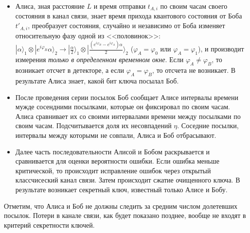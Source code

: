 \begin{itemize}
  \item Алиса, зная расстояние $L$ и время отправки $t_{A,i}$ по своим часам своего состояния в канал связи, знает время прихода квантового состояния от Боба $t'_{A,i}$, преобразует состояния, случайно и независимо от Боба изменяет относительную фазу одной из <<половинок>>: 
  $|\alpha\rangle_1 \otimes |e^{i\varphi_B}\alpha\rangle_2 \rightarrow |\frac{\alpha}{2}\rangle_1 \otimes |\frac{(e^{i\varphi_B} - e^{i\varphi_A})\alpha}{2}\rangle_2$
  ($\varphi_A = \varphi_0$ или $\varphi_A = \varphi_1$), и производит измерения \textit{только в определенном временном окне}. 
  Если $\varphi_A \neq \varphi_B$, то возникает отсчет в детекторе, а если $\varphi_A = \varphi_B$, то отсчета не возникает. В результате Алиса знает, какой бит ключа посылал Боб.
  
  \item После проведения серии посылок Боб сообщает Алисе интервалы времени мужде сосендними посылками, которые он фиксировал по своим часам. Алиса сравнивает их со своими интервалами времени между посылками по своим часам. Подсчитывается доля их несовпадений $\eta$. Соседние посылки, интервалы между которыми не совпали, Алиса и Боб отбрасывают.
  
  \item Далее часть последовательности Алисой и Бобом раскрывается и сравнивается для оценки вероятности ошибки. Если ошибка меньше критической, то происходит исправление ошибок через открытый классчисеский канал связи. Затем происходит сжатие очищенного ключа. В результате возникает секретный ключ, известный только Алисе и Бобу.
\end{itemize}

Отметим, что Алиса и Боб не должны следить за средним числом долетевших посылок. Потери в канале связи, как будет показано позднее, вообще не входят в критерий секретности ключей.
